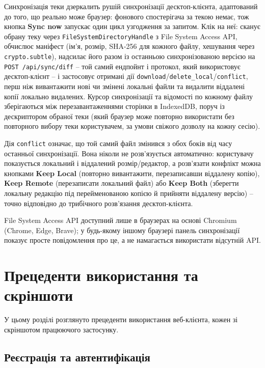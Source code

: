 \documentclass[12pt,a4paper]{article}
\begin{document}
Синхронізація теки дзеркалить рушій синхронізації десктоп-клієнта, адаптований до того, що реально може браузер: фонового спостерігача за текою немає, тож кнопка \textbf{Sync now} запускає один цикл узгодження за запитом. Клік на неї: сканує обрану теку через \texttt{FileSystemDirectoryHandle} з File System Access API, обчислює маніфест (ім'я, розмір, SHA-256 для кожного файлу, хешування через \texttt{crypto.subtle}), надсилає його разом із останньою синхронізованою версією на \texttt{POST /api/sync/diff} -- той самий ендпойнт і протокол, який використовує десктоп-клієнт -- і застосовує отримані дії \texttt{download}/\texttt{delete\_local}/\texttt{conflict}, перш ніж вивантажити нові чи змінені локальні файли та видалити віддалені копії локально видалених. Курсор синхронізації та відомості по кожному файлу зберігаються між перезавантаженнями сторінки в IndexedDB, поруч із дескриптором обраної теки (який браузер може повторно використати без повторного вибору теки користувачем, за умови свіжого дозволу на кожну сесію).

Дія \texttt{conflict} означає, що той самий файл змінився з обох боків від часу останньої синхронізації. Вона ніколи не розв'язується автоматично: користувачу показується локальний і віддалений розмір/редактор, а розв'язати конфлікт можна кнопками \textbf{Keep Local} (повторно вивантажити, перезаписавши віддалену копію), \textbf{Keep Remote} (перезаписати локальний файл) або \textbf{Keep Both} (зберегти локальну редакцію під перейменованою копією й прийняти віддалену версію) -- точно відповідно до трибічного розв'язання десктоп-клієнта.

File System Access API доступний лише в браузерах на основі Chromium (Chrome, Edge, Brave); у будь-якому іншому браузері панель синхронізації показує просте повідомлення про це, а не намагається використати відсутній API.

\section{Прецеденти використання та скріншоти}
\label{sec:usecases}

У цьому розділі розглянуто прецеденти використання веб-клієнта, кожен зі скріншотом працюючого застосунку.

\subsection{Реєстрація та автентифікація}
\end{document}
